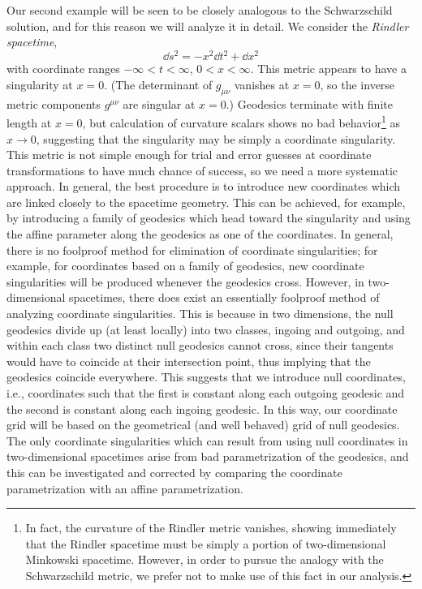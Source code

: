 Our second example will be seen to be closely analogous to the Schwarzschild
solution, and for this reason we will analyze it in detail. We consider the
\emph{Rindler spacetime},
\begin{equation}
  \dd s^2=-x^2\dd t^2+\dd x^2
  \tag{6.4.3}\label{eq:6.4.3}
\end{equation}
with coordinate ranges \(-\infty<t<\infty\), \(0<x<\infty\). This metric
appears to have a singularity at \(x=0\). (The determinant of \(g_{\mu\nu}\)
vanishes at \(x=0\), so the inverse metric components \(g^{\mu\nu}\) are singular
at \(x=0\).) Geodesics terminate with finite length at \(x=0\), but calculation
of curvature scalars shows no bad behavior\footnote{In fact, the curvature of the
Rindler metric vanishes, showing immediately that the Rindler spacetime must be
simply a portion of two-dimensional Minkowski spacetime. However, in order to
pursue the analogy with the Schwarzschild metric, we prefer not to make use of
this fact in our analysis.} as \(x\to0\), suggesting that the singularity may be
simply a coordinate singularity. This metric is not simple enough for trial and
error guesses at coordinate transformations to have much chance of success, so we
need a more systematic approach. In general, the best procedure is to introduce
new coordinates which are linked closely to the spacetime geometry. This can be
achieved, for example, by introducing a family of geodesics which head toward the
singularity and using the affine parameter along the geodesics as one of the
coordinates. In general, there is no foolproof method for elimination of
coordinate singularities; for example, for coordinates based on a family of
geodesics, new coordinate singularities will be produced whenever the geodesics
cross. However, in two-dimensional spacetimes, there does exist an essentially
foolproof method of analyzing coordinate singularities. This is because in two
dimensions, the null geodesics divide up (at least locally) into two classes,
ingoing and outgoing, and within each class two distinct null geodesics cannot
cross, since their tangents would have to coincide at their intersection point,
thus implying that the geodesics coincide everywhere. This suggests that we
introduce null coordinates, i.e., coordinates such that the first is constant
along each outgoing geodesic and the second is constant along each ingoing
geodesic. In this way, our coordinate grid will be based on the geometrical (and
well behaved) grid of null geodesics. The only coordinate singularities which can
result from using null coordinates in two-dimensional spacetimes arise from bad
parametrization of the geodesics, and this can be investigated and corrected by
comparing the coordinate parametrization with an affine parametrization.

